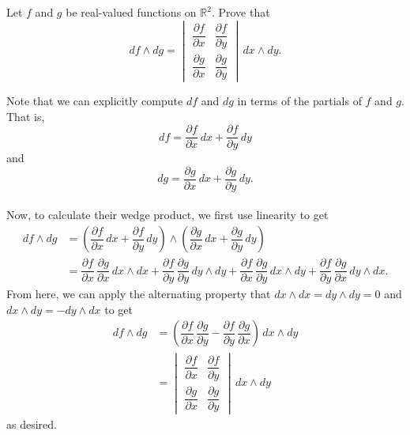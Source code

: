 \documentclass[12 pt, letterpaper]{hmcpset}
\begin{document}
\pagebreak

\begin{problem}[Problem 5]
	Let $f$ and $g$ be real-valued functions on $\mathbb R^2$. Prove that
	\[
		df \wedge dg = \begin{vmatrix}
			\dfrac{\partial f}{\partial x} & \dfrac{\partial f}{\partial y} \\
			\dfrac{\partial g}{\partial x} & \dfrac{\partial g}{\partial y}
		\end{vmatrix} \, dx \wedge dy.
	\]
\end{problem}

\begin{solution}
	Note that we can explicitly compute $df$ and $dg$ in terms of the partials of $f$ and $g$. That is, 
	\[
		df = \dfrac{\partial f}{\partial x} \, dx + \dfrac{\partial f}{\partial y} \, dy
	\]
	and
	\[
		dg = \dfrac{\partial g}{\partial x} \, dx + \dfrac{\partial g}{\partial y} \, dy.
	\]\\
	Now, to calculate their wedge product, we first use linearity to get
	\[
		\begin{split}
			df \wedge dg & = \left ( \dfrac{\partial f}{\partial x} \, dx + \dfrac{\partial f}{\partial y} \, dy \right ) \wedge \left ( \dfrac{\partial g}{\partial x} \, dx + \dfrac{\partial g}{\partial y} \, dy \right ) \\
				     & = \dfrac{\partial f}{\partial x} \, \dfrac{\partial g}{\partial x} \, dx \wedge dx + \dfrac{\partial f}{\partial y} \, \dfrac{\partial g}{\partial y} \, dy \wedge dy + \dfrac{\partial f}{\partial x} \, \dfrac{\partial g}{\partial y} \, dx \wedge dy + \dfrac{\partial f}{\partial y} \, \dfrac{\partial g}{\partial x} \, dy \wedge dx.
		\end{split}
	\]
	From here, we can apply the alternating property that $dx \wedge dx = dy \wedge dy = 0$ and $dx \wedge dy = - dy \wedge dx$ to get
	\[
		\begin{split}
			df \wedge dg & = \left ( \dfrac{\partial f}{\partial x} \, \dfrac{\partial g}{\partial y} - \dfrac{\partial f}{\partial y} \, \dfrac{\partial g}{\partial x} \right ) \, dx \wedge dy \\
				     & = \begin{vmatrix}
			\dfrac{\partial f}{\partial x} & \dfrac{\partial f}{\partial y} \\
			\dfrac{\partial g}{\partial x} & \dfrac{\partial g}{\partial y}
		\end{vmatrix} \, dx \wedge dy
		\end{split}
	\]
	as desired.
\end{solution}
\end{document}
